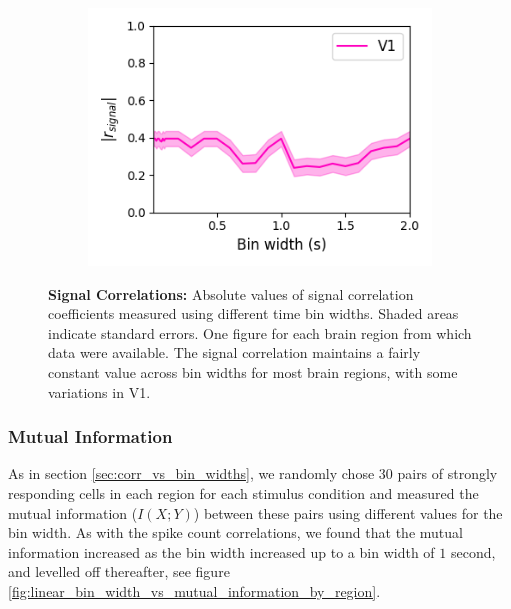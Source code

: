 \documentclass[a4paper,12pt]{article}
\theoremstyle{definition}
\begin{document}
\begin{figure}[p]
\begin{subfigure}{0.5\textwidth}
    \includegraphics[width=\textwidth]{figures/signal_linear_bin_width_correlations_v1_0.png}
  \end{subfigure}
  \caption{\textbf{Signal Correlations:} Absolute values of signal correlation coefficients measured using different time bin widths. Shaded areas indicate standard errors. One figure for each brain region from which data were available. The signal correlation maintains a fairly constant value across bin widths for most brain regions, with some variations in V1.}
  \label{fig:linear_bin_width_vs_signal_correlation_by_region}
\end{figure}

\subsubsection{Mutual Information}
As in section \ref{sec:corr_vs_bin_widths}, we randomly chose $30$ pairs of strongly responding cells in each region for each stimulus condition and measured the mutual information ($I(X;Y)$) between these pairs using different values for the bin width. As with the spike count correlations, we found that the mutual information increased as the bin width increased up to a bin width of $1$ second, and levelled off thereafter, see figure \ref{fig:linear_bin_width_vs_mutual_information_by_region}.
\end{document}
